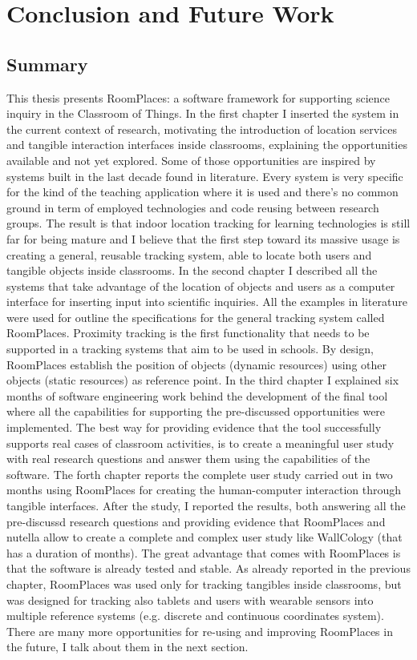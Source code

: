 \chapter{Conclusion and Future Work}

\label {ch:conclusions}

\section{Summary}
This thesis presents RoomPlaces: a software framework for supporting science inquiry in the Classroom of Things. In the first chapter I inserted the system in the current context of research, motivating the introduction of location services and tangible interaction interfaces inside classrooms, explaining the opportunities available and not yet explored. Some of those opportunities are inspired by systems built in the last decade found in literature. Every system is very specific for the kind of the teaching application where it is used and there's no common ground in term of employed technologies and code reusing between research groups. The result is that indoor location tracking for learning technologies is still far for being mature and I believe that the first step toward its massive usage is creating a general, reusable tracking system, able to locate both users and tangible objects inside classrooms. In the second chapter I described all the systems that take advantage of the location of objects and users as a computer interface for inserting input into scientific inquiries. All the examples in literature were used for outline the specifications for the general tracking system called RoomPlaces. Proximity tracking is the first functionality that needs to be supported in a tracking systems that aim to be used in schools. By design, RoomPlaces establish the position of objects (dynamic resources) using other objects (static resources) as reference point. In the third chapter I explained six months of software engineering work behind the development of the final tool where all the capabilities for supporting the pre-discussed opportunities were implemented. The best way for providing evidence that the tool successfully supports real cases of classroom activities, is to create a meaningful user study with real research questions and answer them using the capabilities of the software. The forth chapter reports the complete user study carried out in two months using RoomPlaces for creating the human-computer interaction through tangible interfaces. After the study, I reported the results, both answering all the pre-discussd research questions and providing evidence that RoomPlaces and nutella allow to create a complete and complex user study like WallCology (that has a duration of months). The great advantage that comes with RoomPlaces is that the software is already tested and stable. As already reported in the previous chapter, RoomPlaces was used only for tracking tangibles inside classrooms, but was designed for tracking also tablets and users with wearable sensors into multiple reference systems (e.g. discrete and continuous coordinates system). There are many more opportunities for re-using and improving RoomPlaces in the future, I talk about them in the next section.

